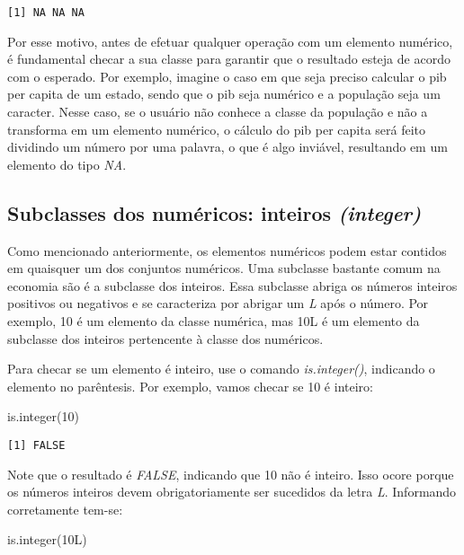 \documentclass[
  letterpaper,
  DIV=11,
  numbers=noendperiod]{scrreprt}
\newenvironment{Shaded}{\begin{snugshade}}{\end{snugshade}}
\newcommand{\DecValTok}[1]{\textcolor[rgb]{0.68,0.00,0.00}{#1}}
\newcommand{\FunctionTok}[1]{\textcolor[rgb]{0.28,0.35,0.67}{#1}}
\newcommand{\NormalTok}[1]{\textcolor[rgb]{0.00,0.23,0.31}{#1}}
\begin{document}
\begin{verbatim}
[1] NA NA NA
\end{verbatim}

Por esse motivo, antes de efetuar qualquer operação com um elemento
numérico, é fundamental checar a sua classe para garantir que o
resultado esteja de acordo com o esperado. Por exemplo, imagine o caso
em que seja preciso calcular o pib per capita de um estado, sendo que o
pib seja numérico e a população seja um caracter. Nesse caso, se o
usuário não conhece a classe da população e não a transforma em um
elemento numérico, o cálculo do pib per capita será feito dividindo um
número por uma palavra, o que é algo inviável, resultando em um elemento
do tipo \emph{NA}.

\subsection{\texorpdfstring{Subclasses dos numéricos: inteiros
\emph{(integer)}}{Subclasses dos numéricos: inteiros (integer)}}\label{subclasses-dos-numuxe9ricos-inteiros-integer}

Como mencionado anteriormente, os elementos numéricos podem estar
contidos em quaisquer um dos conjuntos numéricos. Uma subclasse bastante
comum na economia são é a subclasse dos inteiros. Essa subclasse abriga
os números inteiros positivos ou negativos e se caracteriza por abrigar
um \emph{L} após o número. Por exemplo, 10 é um elemento da classe
numérica, mas 10L é um elemento da subclasse dos inteiros pertencente à
classe dos numéricos.

Para checar se um elemento é inteiro, use o comando \emph{is.integer()},
indicando o elemento no parêntesis. Por exemplo, vamos checar se 10 é
inteiro:

\begin{Shaded}
\begin{Highlighting}[]
\FunctionTok{is.integer}\NormalTok{(}\DecValTok{10}\NormalTok{)}
\end{Highlighting}
\end{Shaded}

\begin{verbatim}
[1] FALSE
\end{verbatim}

Note que o resultado é \emph{FALSE}, indicando que 10 não é inteiro.
Isso ocore porque os números inteiros devem obrigatoriamente ser
sucedidos da letra \emph{L}. Informando corretamente tem-se:

\begin{Shaded}
\begin{Highlighting}[]
\FunctionTok{is.integer}\NormalTok{(}\DecValTok{10}\NormalTok{L)}
\end{Highlighting}
\end{Shaded}
\end{document}
